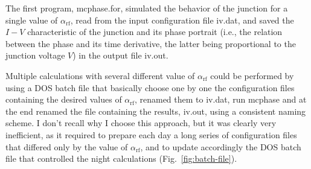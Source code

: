 

The first program, \textsf{mcphase.for}, simulated the behavior of the junction for a single value of $\alpha_\mathrm{rf}$, read from the input configuration file \textsf{iv.dat}, and saved the $I - V$ characteristic of the junction and its phase portrait (i.e., the relation between the phase and its time derivative, the latter being proportional to the junction voltage $V$) in the output file \textsf{iv.out}.

Multiple calculations with several different value of $\alpha_\mathrm{rf}$ could be performed by using a  DOS batch file that basically choose one by one the configuration files containing the desired values of $\alpha_\mathrm{rf}$, renamed them to \textsf{iv.dat}, run \textsf{mcphase} and at the end renamed the file containing the results, \textsf{iv.out}, using a consistent naming scheme.
I don't recall why I choose this approach, but it was clearly very inefficient, as it required to prepare each day a long series of configuration files that differed only by the value of $\alpha_\mathrm{rf}$, and to update accordingly the DOS batch file that controlled the night calculations (Fig.~\ref{fig:batch-file}).



